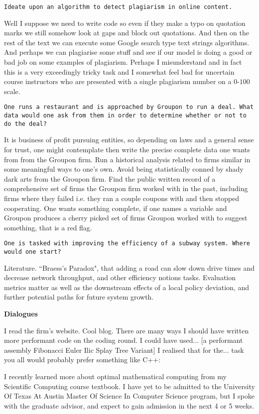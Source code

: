 \texttt{Ideate upon an algorithm to detect plagiarism in online content.}

Well I suppose we need to write code so even if they make a typo on quotation marks we still somehow look at gaps and block out quotations. And then on the rest of the text we can execute some Google search type text strings algorithms. And perhaps we can plagiarise some stuff and see if our model is doing a good or bad job on some examples of plagiarism. Perhaps I misunderstand and in fact this is a very exceedingly tricky task and I somewhat feel bad for uncertain course instructors who are presented with a single plagiarism number on a $0$-$100$ scale.

\texttt{One runs a restaurant and is approached by Groupon to run a deal. What data would one ask from them in order to determine whether or not to do the deal?}

It is business of profit pursuing entities, so depending on laws and a general sense for trust, one might contemplate then write the precise complete data one wants from from the Groupon firm. Run a historical analysis related to firms similar in some meaningful ways to one's own. Avoid being statistically conned by shady dark arts from the Groupon firm. Find the public written record of a comprehensive set of firms the Groupon firm worked with in the past, including firms where they failed i.e. they ran a couple coupons with and then stopped cooperating. One wants something complete, if one names a variable and Groupon produces a cherry picked set of firms Groupon worked with to suggest something, that is a red flag.

\texttt{One is tasked with improving the efficiency of a subway system. Where would one start?}

Literature. ``Braess's Paradox", that adding a road can slow down drive times and decrease network throughput, and other efficiency notions tasks. Evaluation metrics matter as well as the downstream effects of a local policy deviation, and further potential paths for future system growth.

\newpage

\textbf{Dialogues}

I read the firm's website. Cool blog. There are many ways I should have written more performant code on the coding round. I could have used... [a performant assembly Fibonacci Euler Ilic Splay Tree Variant] I realised that for the... task you all would probably prefer something like C++:

I recently learned more about optimal mathematical computing from my Scientific Computing course textbook. I have yet to be admitted to the University Of Texas At Austin Master Of Science In Computer Science program, but I spoke with the graduate advisor, and expect to gain admission in the next 4 or 5 weeks.

